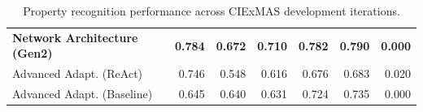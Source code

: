 \documentclass[a4paper,oneside,bibliography=totoc]{scrbook}
\begin{document}
\begin{table}[h]
\begin{tabular}{p{4cm}|rrrrrr}
    \textbf{Network Architecture (Gen2)} & \textbf{0.784}                                   & \textbf{0.672} & \textbf{0.710} & \textbf{0.782} & \textbf{0.790} & \textbf{0.000} \\
    Advanced Adapt. (ReAct)              & 0.746                                            & 0.548          & 0.616          & 0.676          & 0.683          & 0.020          \\
    Advanced Adapt. (Baseline)           & 0.645                                            & 0.640          & 0.631          & 0.724          & 0.735          & 0.000          \\
    \bottomrule
  \end{tabular}
  \caption{Property recognition performance across CIExMAS development iterations.}
  \label{tab:evaluation_properties_iterations}
\end{table}
\end{document}
